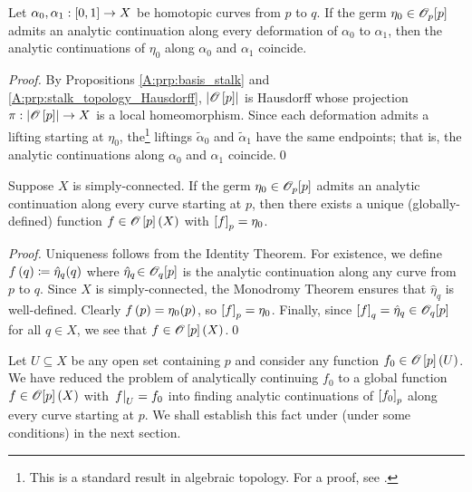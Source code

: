 \documentclass[../Moduli_Spaces_of_Riemann_Surfaces.tex]{subfiles}
\begin{document}
    \begin{corollary}
        Let $\alpha_0,\alpha_1:\left[0,1\right]\to X$ be homotopic curves from $p$ to $q$. If the germ $\eta_0\in\mathscr{O}_p\!\left[p\right]$ admits an analytic continuation along every deformation of $\alpha_0$ to $\alpha_1$, then the analytic continuations of $\eta_0$ along $\alpha_0$ and $\alpha_1$ coincide.
    \end{corollary}
    \begin{proof}
        By Propositions \ref{A:prp:basis_stalk} and \ref{A:prp:stalk_topology_Hausdorff}, $\left|\mathscr{O}\left[p\right]\right|$ is Hausdorff whose projection $\pi:\left|\mathscr{O}\left[p\right]\right|\to X$ is a local homeomorphism. Since each deformation admits a lifting starting at $\eta_0$, the\footnote{This is a standard result in algebraic topology. For a proof, see \cite[][Proposition 4.10]{forster}.} liftings $\tilde{\alpha}_0$ and $\tilde{\alpha}_1$ have the same endpoints; that is, the analytic continuations along $\alpha_0$ and $\alpha_1$ coincide.\qed
    \end{proof}
    \begin{corollary}\label{A:thm:analytically_continue_to_global_function}
        Suppose $X$ is simply-connected. If the germ $\eta_0\in\mathscr{O}_p\!\left[p\right]$ admits an analytic continuation along every curve starting at $p$, then there exists a unique (globally-defined) function $f\in\mathscr{O}\left[p\right]\left(X\right)$ with $\left[f\right]_p=\eta_0$.
    \end{corollary}
    \begin{proof}
        Uniqueness follows from the Identity Theorem. For existence, we define $f\left(q\right)\coloneqq\hat{\eta}_q\!\left(q\right)$ where $\hat{\eta}_q\!\in\mathscr{O}_q\!\left[p\right]$ is the analytic continuation along any curve from $p$ to $q$. Since $X$ is simply-connected, the Monodromy Theorem ensures that $\hat{\eta}_q$ is well-defined. Clearly $f\left(p\right)=\eta_0\!\left(p\right)$, so $\left[f\right]_p=\eta_0$. Finally, since $\left[f\right]_q=\hat{\eta}_q\in\mathscr{O}_q\!\left[p\right]$ for all $q\in X$, we see that $f\in\mathscr{O}\left[p\right]\left(X\right)$.\qed
    \end{proof}
    \begin{remark}
        Let $U\subseteq X$ be any open set containing $p$ and consider any function $f_0\in\mathscr{O}\left[p\right]\left(U\right)$. We have reduced the problem of analytically continuing $f_0$ to a global function $f\in\mathscr{O}[p]\left(X\right)$ with $\left.f\right|_U=f_0$ into finding analytic continuations of $\left[f_0\right]_p$ along every curve starting at $p$. We shall establish this fact under (under some conditions) in the next section.\exqed
    \end{remark}
\end{document}
